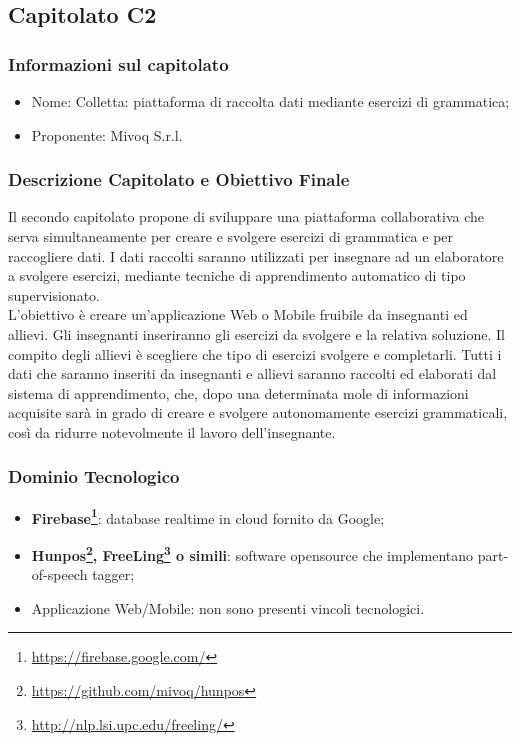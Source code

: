 \subsection{Capitolato C2}\label{C2}

\subsubsection{Informazioni sul capitolato}

\begin{itemize}
	\item Nome: Colletta: piattaforma di raccolta dati mediante esercizi di grammatica;
	\item Proponente: Mivoq S.r.l.
\end{itemize}

\subsubsection{Descrizione Capitolato e Obiettivo Finale}
Il secondo capitolato propone di sviluppare una piattaforma collaborativa che serva simultaneamente per 
creare e svolgere esercizi di grammatica e per raccogliere dati. I dati raccolti saranno utilizzati per insegnare ad un elaboratore a svolgere esercizi, mediante tecniche di apprendimento automatico di tipo supervisionato\glossario.\\
L'obiettivo è creare un'applicazione Web o Mobile fruibile da insegnanti ed allievi. Gli insegnanti inseriranno gli esercizi da svolgere e la relativa soluzione. Il compito degli allievi è scegliere che tipo di esercizi svolgere e completarli. Tutti i dati che saranno inseriti da insegnanti e allievi saranno raccolti ed elaborati dal sistema di apprendimento, che, dopo una determinata mole di informazioni acquisite sarà in grado di creare e svolgere autonomamente esercizi grammaticali, così da ridurre notevolmente il lavoro dell'insegnante.

\subsubsection{Dominio Tecnologico}\label{C2_DomTec}
\begin{itemize}
	\item \textbf{Firebase\footnote{\hyperref[Link al sito]{https://firebase.google.com/}}}: database realtime in cloud fornito da Google;
	\item \textbf{Hunpos\footnote{\hyperref[Link al sito]{https://github.com/mivoq/hunpos}}, FreeLing\footnote{\hyperref[Link al sito]{http://nlp.lsi.upc.edu/freeling/}} o simili}: software opensource che implementano part-of-speech tagger\glossario;
	\item Applicazione Web/Mobile: non sono presenti vincoli tecnologici.
\end{itemize}


